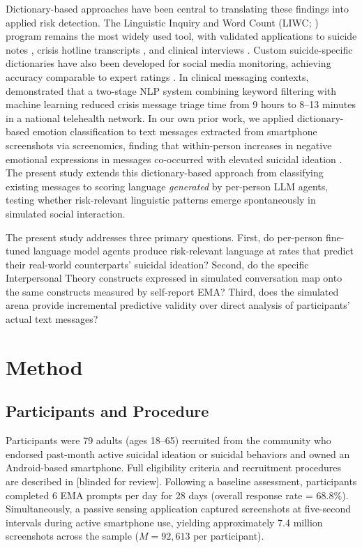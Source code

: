 \documentclass[review,12pt,authoryear]{elsarticle}
\begin{document}
Dictionary-based approaches have been central to translating these findings into applied risk detection. The Linguistic Inquiry and Word Count (LIWC; \citealt{pennebaker2015development}) program remains the most widely used tool, with validated applications to suicide notes \citep{pestian2012sentiment}, crisis hotline transcripts \citep{huang2024mindsets}, and clinical interviews \citep{tausczik2010psychological}. Custom suicide-specific dictionaries have also been developed for social media monitoring, achieving accuracy comparable to expert ratings \citep{lv2015creating}. In clinical messaging contexts, \citet{swaminathan2023nlp} demonstrated that a two-stage NLP system combining keyword filtering with machine learning reduced crisis message triage time from 9 hours to 8--13 minutes in a national telehealth network. In our own prior work, we applied dictionary-based emotion classification to text messages extracted from smartphone screenshots via screenomics, finding that within-person increases in negative emotional expressions in messages co-occurred with elevated suicidal ideation \citep{ammerman2026beyond}. The present study extends this dictionary-based approach from classifying existing messages to scoring language \textit{generated} by per-person LLM agents, testing whether risk-relevant linguistic patterns emerge spontaneously in simulated social interaction.

The present study addresses three primary questions. First, do per-person fine-tuned language model agents produce risk-relevant language at rates that predict their real-world counterparts' suicidal ideation? Second, do the specific Interpersonal Theory constructs expressed in simulated conversation map onto the same constructs measured by self-report EMA? Third, does the simulated arena provide incremental predictive validity over direct analysis of participants' actual text messages?


\section{Method}

\subsection{Participants and Procedure}

Participants were 79 adults (ages 18--65) recruited from the community who endorsed past-month active suicidal ideation or suicidal behaviors and owned an Android-based smartphone. Full eligibility criteria and recruitment procedures are described in [blinded for review]. Following a baseline assessment, participants completed 6 EMA prompts per day for 28 days (overall response rate = 68.8\%). Simultaneously, a passive sensing application captured screenshots at five-second intervals during active smartphone use, yielding approximately 7.4 million screenshots across the sample ($M = 92{,}613$ per participant). 
\end{document}
